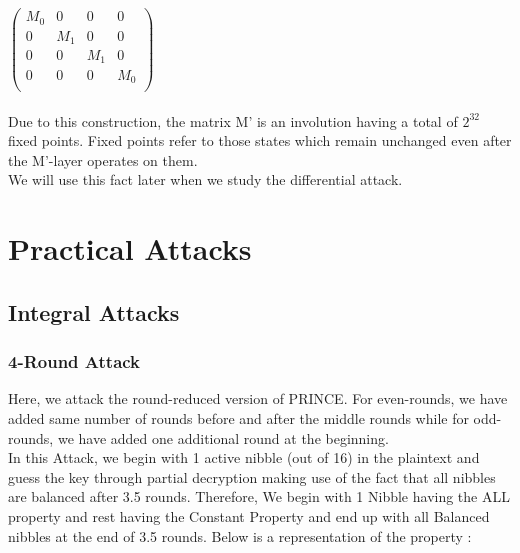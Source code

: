 \documentclass{transcrypto}
\begin{document}
 $\begin{pmatrix} 
    M_0 & 0 & 0 & 0\\
    0 & M_1 & 0 & 0\\
    0 & 0 & M_1 & 0\\
    0 & 0 & 0 & M_0\\
\end{pmatrix}$
\\ \\
Due to this construction, the matrix M' is an involution having a total of $2^{32}$ fixed points. Fixed points refer to those states which remain unchanged even after the M'-layer operates on them. \\ 
We will use this fact later when we study the differential attack. \\
\section{Practical Attacks}
\subsection{Integral Attacks}
\subsubsection{4-Round Attack}
Here, we attack the round-reduced version of PRINCE. For even-rounds, we have added same number of rounds before and after the middle rounds while for odd-rounds, we have added one additional round at the beginning. \\
In this Attack, we begin with 1 active nibble (out of 16) in the plaintext and guess the key through partial decryption making use of the fact that all nibbles are balanced after 3.5 rounds. 
Therefore, We begin with 1 Nibble having the ALL property and rest having the Constant Property and end up with all Balanced nibbles at the end of 3.5 rounds. Below is a representation of the property : \\ \\
\end{document}
